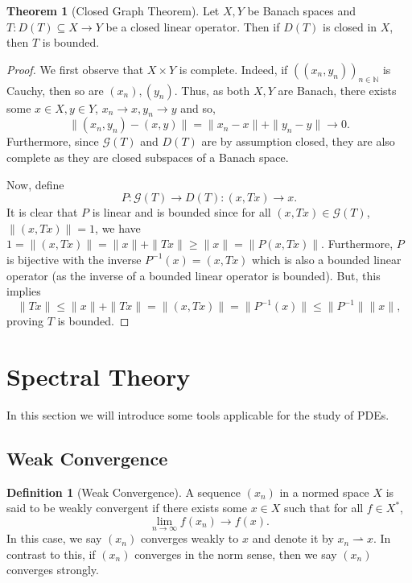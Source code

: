 \documentclass[]{article}
\theoremstyle{definition}
\newtheorem{theorem}{Theorem}
\theoremstyle{definition}
\newtheorem{definition}{Definition}[section]
\newcommand{\weak}{\rightharpoonup}
\begin{document}
\begin{theorem}[Closed Graph Theorem]
  Let \(X, Y\) be Banach spaces and \(T : D(T) \subseteq X \to Y\) be a closed 
  linear operator. Then if \(D(T)\) is closed in \(X\), then \(T\) is bounded.
\end{theorem}
\begin{proof}
  We first observe that \(X \times Y\) is complete. Indeed, if 
  \(((x_n, y_n))_{n \in \mathbb{N}}\) is Cauchy, then so are \((x_n), (y_n)\). 
  Thus, as both \(X, Y\) are Banach, there exists some \(x \in X, y \in Y\), 
  \(x_n \to x, y_n \to y\) and so, 
  \[\|(x_n, y_n) - (x, y)\| = \|x_n - x\| + \|y_n - y\| \to 0.\]
  Furthermore, since \(\mathcal{G}(T)\) and \(D(T)\) are by assumption closed, 
  they are also complete as they are closed subspaces of a Banach space.

  Now, define 
  \[P : \mathcal{G}(T) \to D(T) : (x, Tx) \to x.\]
  It is clear that \(P\) is linear and is bounded since for all \((x, Tx) \in 
  \mathcal{G}(T)\), \(\|(x, Tx)\| = 1\), we have 
  \(1 = \|(x, Tx)\| = \|x\| + \|Tx\| \ge \|x\| = \|P(x, Tx)\|\). Furthermore, 
  \(P\) is bijective with the inverse \(P^{-1}(x) = (x, Tx)\) which is also 
  a bounded linear operator (as the inverse of a bounded linear operator is 
  bounded). But, this implies 
  \[\|Tx\| \le \|x\| + \|Tx\| = \|(x, Tx)\| = \|P^{-1}(x)\| \le \|P^{-1}\|\|x\|,\]
  proving \(T\) is bounded.
\end{proof}

\newpage
\section{Spectral Theory}

In this section we will introduce some tools applicable for the study of PDEs.

\subsection{Weak Convergence}

\begin{definition}[Weak Convergence]
  A sequence \((x_n)\) in a normed space \(X\) is said to be weakly convergent 
  if there exists some \(x \in X\) such that for all \(f \in X^*\), 
  \[\lim_{n \to \infty} f(x_n) \to f(x).\]
  In this case, we say \((x_n)\) converges weakly to \(x\) and denote it by 
  \(x_n \weak x\). In contrast to this, if \((x_n)\) converges in the norm
  sense, then we say \((x_n)\) converges strongly.
\end{definition}
\end{document}

